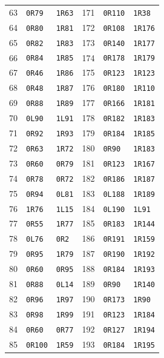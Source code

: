 \begin{longtable}{rll@{\hspace{18mm}}rll}
63 & \texttt{0R79} & \texttt{1R63} & 171 & \texttt{0R110} & \texttt{1R38} \\
64 & \texttt{0R80} & \texttt{1R81} & 172 & \texttt{0R108} & \texttt{1R176} \\
65 & \texttt{0R82} & \texttt{1R83} & 173 & \texttt{0R140} & \texttt{1R177} \\
66 & \texttt{0R84} & \texttt{1R85} & 174 & \texttt{0R178} & \texttt{1R179} \\
67 & \texttt{0R46} & \texttt{1R86} & 175 & \texttt{0R123} & \texttt{1R123} \\
68 & \texttt{0R48} & \texttt{1R87} & 176 & \texttt{0R180} & \texttt{1R110} \\
69 & \texttt{0R88} & \texttt{1R89} & 177 & \texttt{0R166} & \texttt{1R181} \\
70 & \texttt{0L90} & \texttt{1L91} & 178 & \texttt{0R182} & \texttt{1R183} \\
71 & \texttt{0R92} & \texttt{1R93} & 179 & \texttt{0R184} & \texttt{1R185} \\
72 & \texttt{0R63} & \texttt{1R72} & 180 & \texttt{0R90} & \texttt{1R183} \\
73 & \texttt{0R60} & \texttt{0R79} & 181 & \texttt{0R123} & \texttt{1R167} \\
74 & \texttt{0R78} & \texttt{0R72} & 182 & \texttt{0R186} & \texttt{1R187} \\
75 & \texttt{0R94} & \texttt{0L81} & 183 & \texttt{0L188} & \texttt{1R189} \\
76 & \texttt{1R76} & \texttt{1L15} & 184 & \texttt{0L190} & \texttt{1L91} \\
77 & \texttt{0R55} & \texttt{1R77} & 185 & \texttt{0R183} & \texttt{1R144} \\
78 & \texttt{0L76} & \texttt{0R2} & 186 & \texttt{0R191} & \texttt{1R159} \\
79 & \texttt{0R95} & \texttt{1R79} & 187 & \texttt{0R190} & \texttt{1R192} \\
80 & \texttt{0R60} & \texttt{0R95} & 188 & \texttt{0R184} & \texttt{1R193} \\
81 & \texttt{0R88} & \texttt{0L14} & 189 & \texttt{0R90} & \texttt{1R140} \\
82 & \texttt{0R96} & \texttt{1R97} & 190 & \texttt{0R173} & \texttt{1R90} \\
83 & \texttt{0R98} & \texttt{1R99} & 191 & \texttt{0R123} & \texttt{1R184} \\
84 & \texttt{0R60} & \texttt{0R77} & 192 & \texttt{0R127} & \texttt{1R194} \\
85 & \texttt{0R100} & \texttt{1R59} & 193 & \texttt{0R184} & \texttt{1R195} \\

\end{longtable}
